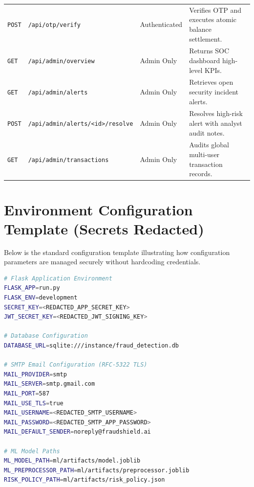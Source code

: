 \begin{table}[h]
\begin{tabularx}{\textwidth}{llp{3.2cm}X}
\texttt{POST} & \texttt{/api/otp/verify} & Authenticated & Verifies OTP and executes atomic balance settlement. \\
\texttt{GET} & \texttt{/api/admin/overview} & Admin Only & Returns SOC dashboard high-level KPIs. \\
\texttt{GET} & \texttt{/api/admin/alerts} & Admin Only & Retrieves open security incident alerts. \\
\texttt{POST} & \texttt{/api/admin/alerts/<id>/resolve} & Admin Only & Resolves high-risk alert with analyst audit notes. \\
\texttt{GET} & \texttt{/api/admin/transactions} & Admin Only & Audits global multi-user transaction records. \\
\bottomrule
\end{tabularx}
\end{table}

\section{Environment Configuration Template (Secrets Redacted)}
Below is the standard configuration template illustrating how configuration parameters are managed securely without hardcoding credentials.

\begin{lstlisting}[language=bash, caption={Sanitized Environment Template (\texttt{.env.example})}]
# Flask Application Environment
FLASK_APP=run.py
FLASK_ENV=development
SECRET_KEY=<REDACTED_APP_SECRET_KEY>
JWT_SECRET_KEY=<REDACTED_JWT_SIGNING_KEY>

# Database Configuration
DATABASE_URL=sqlite:///instance/fraud_detection.db

# SMTP Email Configuration (RFC-5322 TLS)
MAIL_PROVIDER=smtp
MAIL_SERVER=smtp.gmail.com
MAIL_PORT=587
MAIL_USE_TLS=true
MAIL_USERNAME=<REDACTED_SMTP_USERNAME>
MAIL_PASSWORD=<REDACTED_SMTP_APP_PASSWORD>
MAIL_DEFAULT_SENDER=noreply@fraudshield.ai

# ML Model Paths
ML_MODEL_PATH=ml/artifacts/model.joblib
ML_PREPROCESSOR_PATH=ml/artifacts/preprocessor.joblib
RISK_POLICY_PATH=ml/artifacts/risk_policy.json
\end{lstlisting}
